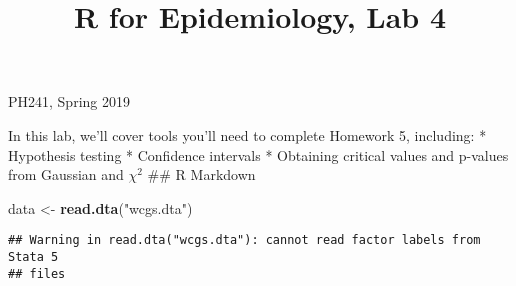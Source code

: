 \documentclass[]{article}
\title{R for Epidemiology, Lab 4}
\author{}
\date{}
\newenvironment{Shaded}{\begin{snugshade}}{\end{snugshade}}
\newcommand{\KeywordTok}[1]{\textcolor[rgb]{0.13,0.29,0.53}{\textbf{#1}}}
\newcommand{\StringTok}[1]{\textcolor[rgb]{0.31,0.60,0.02}{#1}}
\newcommand{\OperatorTok}[1]{\textcolor[rgb]{0.81,0.36,0.00}{\textbf{#1}}}
\newcommand{\NormalTok}[1]{#1}
\begin{document}
\maketitle

\center PH241, Spring 2019 \center

In this lab, we'll cover tools you'll need to complete Homework 5,
including: * Hypothesis testing * Confidence intervals * Obtaining
critical values and p-values from Gaussian and \(\chi^{2}\) \#\# R
Markdown

\begin{Shaded}
\begin{Highlighting}[]
\NormalTok{data <-}\StringTok{ }\KeywordTok{read.dta}\NormalTok{(}\StringTok{"wcgs.dta"}\NormalTok{)}
\end{Highlighting}
\end{Shaded}

\begin{verbatim}
## Warning in read.dta("wcgs.dta"): cannot read factor labels from Stata 5
## files
\end{verbatim}

\begin{Shaded}
\end{Shaded}
\end{document}
